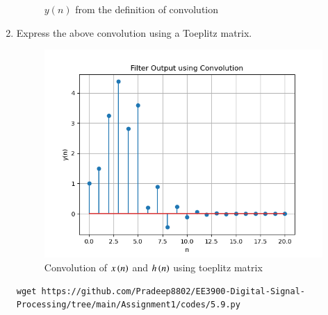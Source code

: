 \documentclass[journal,12pt,twocolumn]{IEEEtran}
\renewcommand\thesection{\arabic{section}}
\begin{document}
\begin{enumerate}[label=\thesection.\arabic*]
\begin{figure}[!ht]
		\caption{$y(n)$ from the definition of convolution}
		\label{fig:y_n_convo}
	\end{figure}
	  \item Express the above convolution using a Toeplitz matrix.\\
	\solution 
	\begin{figure}
		\centering
		\includegraphics[width = \columnwidth]{figs/5.9.png}
		\caption{Convolution of $x\left(n\right)$ and $h\left(n\right)$ using toeplitz matrix}
		\label{5.9}
	\end{figure}
	\begin{lstlisting}
wget https://github.com/Pradeep8802/EE3900-Digital-Signal-Processing/tree/main/Assignment1/codes/5.9.py
	\end{lstlisting}


\end{enumerate}
\end{document}
